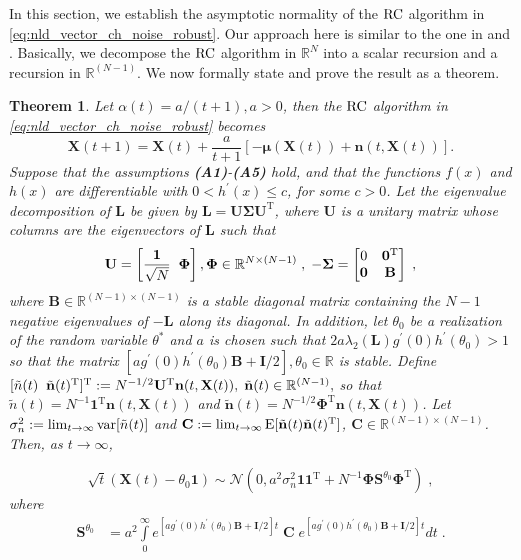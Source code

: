 \documentclass[onecolumn, draft, 12pt]{IEEEtran}
\newcommand{\E}{{\rm E}}
\newcommand{\R}{\mathbb{R}}
\newcommand{\Rn}{\mathbb{R}^{N}}
\newcommand{\Rnm}{\mathbb{R}^{(N-1)}}
\newcommand{\Rmn}{\mathbb{R}^{N \times (N-1) }}
\newcommand{\Rnmm}{\mathbb{R}^{(N-1) \times (N-1)}}
\newcommand{\rnld}{\rm RC}
\newcommand{\onevect}{\mathbf{1}}
\newcommand{\onevectT}{\mathbf{1}^{\mathrm{T}}}
\newcommand{\La}{\mathbf{L}}
\newcommand{\B}{\mathbf{B}}
\newcommand{\I}{\mathbf{I}}
\newcommand{\U}{\mathbf{U}}
\newcommand{\Sgma}{\mathbf{\Sigma}}
\newcommand{\UT}{\mathbf{U}^{\mathrm{T}}}
\newcommand{\Czero}{\mathbf{C}}
\newcommand{\So}{\mathbf{S}}
\newcommand{\Stheta}{\So^{\theta_0}}
\newcommand{\fiN}{\mathbf{\Phi}}
\newcommand{\fiNT}{\mathbf{\Phi}^{\mathrm{T}}}
\newcommand{\X}{\mathbf{X}}
\newcommand{\cval}{\ensuremath{\theta^{*}}}
\newcommand{\mXt}{\mathbf{\boldsymbol\mu}(\mathbf{X}(t))}
\newcommand{\nv}{\mathbf{n}}
\newcommand{\ntilde}{\tilde{\mathbf{n}}}
\newcommand{\ntildet}{\tilde{\mathbf{n}}(t)}
\newtheorem{thm}{Theorem}
\begin{document}
In this section, we establish the asymptotic normality of the $\rnld$ algorithm in \eqref{eq:nld_vector_ch_noise_robust}. Our approach here is similar to the one in \cite{MinyiHuang2008} and \cite{dastep2013}. Basically, we decompose the $\rnld$ algorithm in $\Rn$ into a scalar recursion and a recursion in $\Rnm$. We now formally state and prove the result as a theorem. 

\begin{thm} \label{asym_norm_nld_lemma_robust}
Let $\alpha(t)=a / (t+1), a>0$, then the $\rnld$ algorithm in \eqref{eq:nld_vector_ch_noise_robust} becomes
\begin{equation} \label{eq:asym_norm_nld_lemma1_robust}
\X(t+1) = \X(t) + \frac{a}{t+1} \left [ - \mXt + \nv(t,\X(t)) \right ]. 
\end{equation}
Suppose that the assumptions \textbf{(A1)}-\textbf{(A5)} hold, and that the functions $f(x)$ and $h(x)$ are differentiable with $0 < h^{'}(x)  \leq c$, for some $c>0$. Let the eigenvalue decomposition of $\La$ be given by $\La=\U \Sgma \UT$, where $\U$ is a unitary matrix whose columns are the eigenvectors of $\La$ such that 
\begin{equation} \label{eq:asymp_norm_linear2_robust} 
\U=\left [ \frac{\onevect}{\sqrt{N}} \;\; \fiN \right ], \fiN \in \Rmn \;, \; -\Sgma = \begin{bmatrix} 0  &  \mathbf{0}^{\rm T}  \\ \mathbf{0}  &  \B \\ \end{bmatrix} \;,
\end{equation} where $\B \in \Rnmm$ is a stable diagonal matrix containing the $N-1$ negative eigenvalues of $-\La$ along its diagonal. In addition, let $\theta_0$ be a realization of the random variable $\cval$ and $a$ is chosen such that $ 2 a \lambda_2(\La) g^{'}(0) h^{'}(\theta_0) >1$ so that the matrix $\left [a g^{'}(0) h^{'}(\theta_0) \B + \I /2 \right ] , \theta_0 \in \R$ is stable. Define $[\tilde{n}(t) \; \; \ntildet^{\rm T}]^{\rm T}:= N^{-1/2}  \UT \nv(t,\X(t)), \; \ntildet \in \Rnm,$ so that $\tilde{n}(t)= N^{-1}  \onevectT \nv(t,\X(t))$ and $\ntildet= N^{-1/2}  \fiNT \nv(t,\X(t))$. Let $\sigma^2_{n}:=\lim_{t \rightarrow \infty} {\rm var}[\tilde{n}(t)]$ and $\Czero := \lim_{t \rightarrow \infty} \E[\ntilde(t) \ntilde(t)^{\rm T} ]$, $\Czero \in \Rnmm$. Then, as $t \rightarrow \infty$,

\begin{equation} \label{eq:asym_norm_nld_lemma4_robust}
\sqrt{t}(\X(t) - \theta_0 \onevect) \sim \mathcal{N} \left(0, a^2 \sigma^2_{n} \onevect \onevectT + N^{-1} \fiN \Stheta \fiNT \right) \;,
\end{equation}
where \begin{align}
\label{eq:asym_norm_nld_lemma7_robust}
\Stheta    & = a^2 \int\limits_{0}^{\infty} e^{\left [a g^{'}(0) h^{'}(\theta_0) \B + \I/2 \right ] t} \; \Czero \; e^{\left [a g^{'}(0) h^{'}(\theta_0) \B + \I/2 \right ] t} dt \;.
\end{align}
\end{thm}
\end{document}

